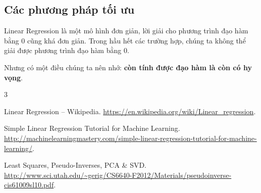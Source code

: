 \documentclass[runningheads]{llncs}
\begin{document}
\subsection{Các phương pháp tối ưu}

Linear Regression là một mô hình đơn giản, lời giải cho phương trình đạo hàm
bằng 0 cũng khá đơn giản. Trong hầu hết các trường hợp, chúng ta không thể
giải được phương trình đạo hàm bằng 0.

Nhưng có một điều chúng ta nên nhớ: \textbf{còn tính được đạo hàm là còn có
hy vọng}.

\renewcommand{\refname}{Tài liệu tham khảo}
{}
\begin{thebibliography}{3}\raggedright
{}
Linear Regression -- Wikipedia.
\url{https://en.wikipedia.org/wiki/Linear_regression}.

Simple Linear Regression Tutorial for Machine Learning.
\url{http://machinelearningmastery.com/simple-linear-regression-tutorial-for-machine-learning/}.

Least Squares, Pseudo-Inverses, PCA \& SVD.
\url{http://www.sci.utah.edu/~gerig/CS6640-F2012/Materials/pseudoinverse-cis61009sl10.pdf}.
\end{thebibliography}
\end{document}
